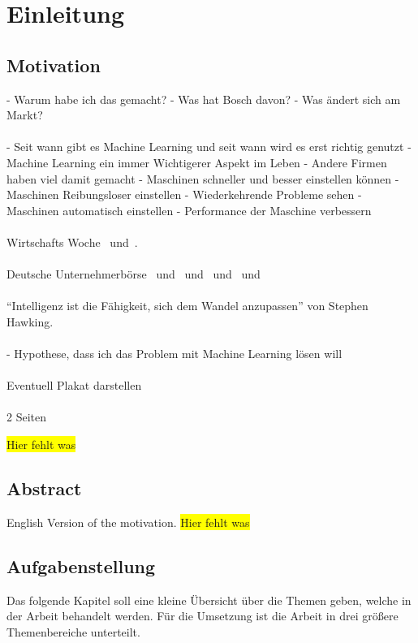 \chapter{Einleitung}
\label{ch:einleitung}

\section{Motivation}
\label{sec:motivation}
- Warum habe ich das gemacht?
- Was hat Bosch davon?
- Was ändert sich am Markt?
\\ \\
- Seit wann gibt es Machine Learning und seit wann wird es erst richtig genutzt
- Machine Learning ein immer Wichtigerer Aspekt im Leben
- Andere Firmen haben viel damit gemacht
- Maschinen schneller und besser einstellen können
- Maschinen Reibungsloser einstellen
- Wiederkehrende Probleme sehen
- Maschinen automatisch einstellen
- Performance der Maschine verbessern
\\ \\
Wirtschafts Woche~\cite{article_einleitung_ww_sg} und~\cite{article_einleitung_ww_cm}.
\\ \\
Deutsche Unternehmerbörse~\cite{article_einleitung_dub_ki} und~\cite{article_einleitung_dub_aw}
und~\cite{article_einleitung_dub_jb} und~\cite{article_einleitung_dub_sb} und~\cite{article_einleitung_dub_il}
\\ \\
\enquote{Intelligenz ist die Fähigkeit, sich dem Wandel anzupassen} von Stephen Hawking.
\\ \\
- Hypothese, dass ich das Problem mit Machine Learning lösen will
\\ \\
Eventuell Plakat darstellen
\\ \\
2 Seiten

\colorbox{yellow}{Hier fehlt was}

\newpage

\section{Abstract}
English Version of the motivation.
\colorbox{yellow}{Hier fehlt was}

\newpage

\section{Aufgabenstellung}
\label{sec:aufgabenstellung}
Das folgende Kapitel soll eine kleine Übersicht über die Themen geben, welche in der Arbeit behandelt werden. Für die
Umsetzung ist die Arbeit in drei größere Themenbereiche unterteilt.

